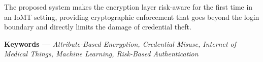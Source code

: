 \documentclass[12pt,a4paper]{report}
\numberwithin{equation}{section}
\begin{document}
The proposed system makes the encryption layer risk-aware for the first time in an IoMT setting, providing cryptographic enforcement that goes beyond the login boundary and directly limits the damage of credential theft.

    \textbf{Keywords ---} \textit{Attribute-Based Encryption, Credential Misuse, Internet of Medical Things, Machine Learning, Risk-Based Authentication}

    \newpage
    

\normalsize
    
    


 

    
\end{document}
